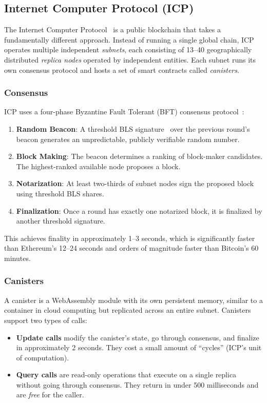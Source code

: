 \documentclass[journal]{IEEEtran}
\begin{document}
\subsection{Internet Computer Protocol (ICP)}
\label{subsec:icp}

The Internet Computer Protocol~\cite{hanke2018dfinity,dfinity2022geeks} is a public blockchain that takes a fundamentally different approach. Instead of running a single global chain, ICP operates multiple independent \emph{subnets}, each consisting of 13--40 geographically distributed \emph{replica nodes} operated by independent entities. Each subnet runs its own consensus protocol and hosts a set of smart contracts called \emph{canisters}.

\subsubsection{Consensus}
ICP uses a four-phase Byzantine Fault Tolerant (BFT) consensus protocol~\cite{hanke2018dfinity}:
\begin{enumerate}
  \item \textbf{Random Beacon}: A threshold BLS signature~\cite{boneh2001bls} over the previous round's beacon generates an unpredictable, publicly verifiable random number.
  \item \textbf{Block Making}: The beacon determines a ranking of block-maker candidates. The highest-ranked available node proposes a block.
  \item \textbf{Notarization}: At least two-thirds of subnet nodes sign the proposed block using threshold BLS shares.
  \item \textbf{Finalization}: Once a round has exactly one notarized block, it is finalized by another threshold signature.
\end{enumerate}

This achieves finality in approximately 1--3 seconds, which is significantly faster than Ethereum's 12--24 seconds and orders of magnitude faster than Bitcoin's 60 minutes.

\subsubsection{Canisters}
A canister is a WebAssembly module with its own persistent memory, similar to a container in cloud computing but replicated across an entire subnet. Canisters support two types of calls:
\begin{itemize}[leftmargin=*]
  \item \textbf{Update calls} modify the canister's state, go through consensus, and finalize in approximately 2 seconds. They cost a small amount of ``cycles'' (ICP's unit of computation).
  \item \textbf{Query calls} are read-only operations that execute on a single replica without going through consensus. They return in under 500 milliseconds and are \emph{free} for the caller.
\end{itemize}
\end{document}
